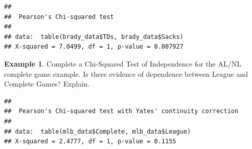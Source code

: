 \documentclass[
  11pt,
]{book}
\newenvironment{Shaded}{\begin{snugshade}}{\end{snugshade}}
\newcommand{\AttributeTok}[1]{\textcolor[rgb]{0.77,0.63,0.00}{#1}}
\newcommand{\DecValTok}[1]{\textcolor[rgb]{0.00,0.00,0.81}{#1}}
\newcommand{\FunctionTok}[1]{\textcolor[rgb]{0.00,0.00,0.00}{#1}}
\newcommand{\NormalTok}[1]{#1}
\newcommand{\OtherTok}[1]{\textcolor[rgb]{0.56,0.35,0.01}{#1}}
\newcommand{\SpecialCharTok}[1]{\textcolor[rgb]{0.00,0.00,0.00}{#1}}
\newcommand{\StringTok}[1]{\textcolor[rgb]{0.31,0.60,0.02}{#1}}
\theoremstyle{definition}
\theoremstyle{definition}
\newtheorem{example}{Example}[chapter]
\theoremstyle{definition}
\theoremstyle{definition}
\theoremstyle{remark}
\begin{document}
\begin{verbatim}
## 
##  Pearson's Chi-squared test
## 
## data:  table(brady_data$TDs, brady_data$Sacks)
## X-squared = 7.0499, df = 1, p-value = 0.007927
\end{verbatim}

\newpage

\begin{example}
Complete a Chi-Squared Test of Independence for the AL/NL complete game example. Is there evidence of dependence between League and Complete Games? Explain.
\end{example}

\vfill

\begin{Shaded}
\end{Shaded}

\begin{verbatim}
## 
##  Pearson's Chi-squared test with Yates' continuity correction
## 
## data:  table(mlb_data$Complete, mlb_data$League)
## X-squared = 2.4777, df = 1, p-value = 0.1155
\end{verbatim}
\end{document}
